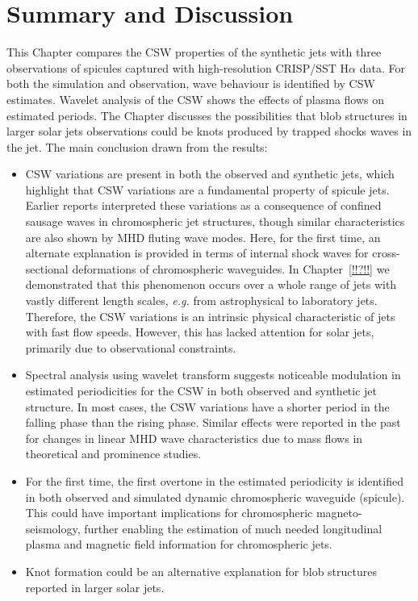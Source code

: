 \documentclass[12pt]{ociamthesis}
\begin{document}
\section{Summary and Discussion}
\label{sec:sum}
This Chapter compares the CSW properties of the synthetic jets with three observations of spicules captured with high-resolution CRISP/SST H$\alpha$ data. For both the simulation and observation, wave behaviour is identified by CSW estimates. Wavelet analysis of the CSW shows the effects of plasma flows on estimated periods. The Chapter discusses the possibilities that blob structures in larger solar jets observations could be knots produced by trapped shocks waves in the jet. The main conclusion drawn from the results:
\begin{itemize}
    \item{CSW variations are present in both the observed and synthetic jets, which highlight that CSW variations are a fundamental property of spicule jets. Earlier reports interpreted these variations as a consequence of confined sausage waves in chromospheric jet structures, though similar characteristics are also shown by MHD fluting wave modes. Here, for the first time, an alternate explanation is provided in terms of internal shock waves for cross-sectional deformations of chromospheric waveguides. In Chapter~\ref{!!?!!} we demonstrated that this phenomenon occurs over a whole range of jets with vastly different length scales, \textit{e.g.} from astrophysical to laboratory jets. Therefore, the CSW variations is an intrinsic physical characteristic of jets with fast flow speeds. However, this has lacked attention for solar jets, primarily due to observational constraints.}

    \item{Spectral analysis using wavelet transform suggests noticeable modulation in estimated periodicities for the CSW in both observed and synthetic jet structure. In most cases, the CSW variations have a shorter period in the falling phase than the rising phase. Similar effects were reported in the past for changes in linear MHD wave characteristics due to mass flows in theoretical and prominence studies.}

    \item{For the first time, the first overtone in the estimated periodicity is identified in both observed and simulated dynamic chromospheric waveguide (spicule). This could have important implications for chromospheric magneto-seismology, further enabling the estimation of much needed longitudinal plasma and magnetic field information for chromospheric jets.}
    
    \item{Knot formation could be an alternative explanation for blob structures reported in larger solar jets.}
\end{itemize}
\end{document}
